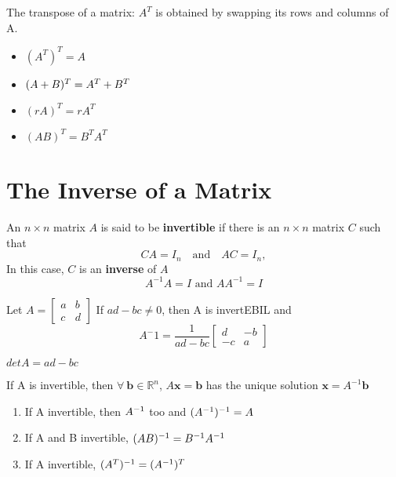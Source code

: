 \documentclass{report}
\begin{document}
The transpose of a matrix: \( A^T \) is obtained by swapping its rows and columns of A.
\begin{theorem}\end{theorem}

\begin{tcolorbox}[colback=blue!5!white, colframe=blue!75!black]
\begin{itemize}
    \item $(A^T)^T = A$ 
    \item $(A + B)^T = A^{T} + B^T$ 
    \item $(rA)^T = r A^T$ 
    \item $(AB)^T = B^T A^T$ 
\end{itemize}
\end{tcolorbox}

\section{The Inverse of a Matrix}

An \( n \times n \) matrix \( A \) is said to be \textbf{invertible} if there is an \( n \times n \) matrix \( C \) such that
\[
C A = I_n \quad \text{and} \quad A C = I_n,
\]
In this case, $C$ is an \textbf{inverse} of $A$
\[
A^{-1} A = I \text{ and } A A^{-1} = I
\]

\begin{theorem}
    Let $A = \begin{bmatrix}
        a & b \\ c & d
    \end{bmatrix}$ 
    If $ad - bc \ne 0$, then A is invertEBIL and 
    \[
    A^-1 = \frac{1}{ad -bc}\begin{bmatrix}
        d & -b \\ -c & a
    \end{bmatrix}
    \]
\end{theorem}

$det A = ad - bc$

\begin{theorem}
    If A is invertible, then $\forall \ \mathbf{b} \in \mathbb{R}^n$, 
    $A\mathbf{x} = \mathbf{b}$  
    has the unique solution $\mathbf{x} = A^{-1}\mathbf{b}$
\end{theorem}
\vspace{1cm}
\begin{theorem}
\begin{enumerate}
    \item If A invertible, then $A^{-1}$ too and $(A^{-1})^{-1} = A$
    \item If A and B invertible, $(AB)^{-1} = B^{-1}A^{-1}$
    \item If A invertible, $(A^T)^{-1} = (A^{-1})^T$
\end{enumerate}
\end{theorem}
\end{document}
